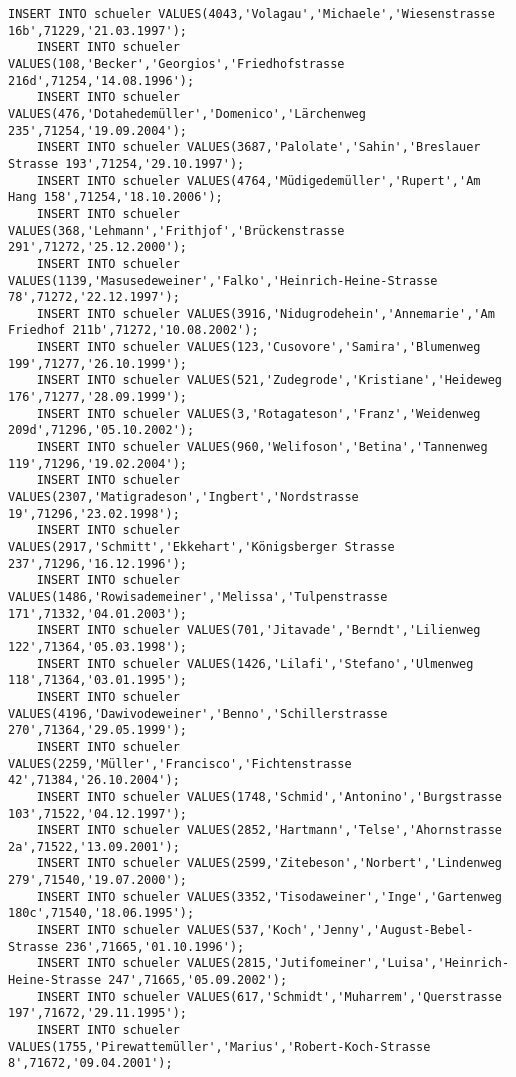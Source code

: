 \begin{lstlisting}[breaklines=True, numbers=none, basicstyle=\tiny, keepspaces=false]
	INSERT INTO schueler VALUES(4043,'Volagau','Michaele','Wiesenstrasse 16b',71229,'21.03.1997');
	INSERT INTO schueler VALUES(108,'Becker','Georgios','Friedhofstrasse 216d',71254,'14.08.1996');
	INSERT INTO schueler VALUES(476,'Dotahedemüller','Domenico','Lärchenweg 235',71254,'19.09.2004');
	INSERT INTO schueler VALUES(3687,'Palolate','Sahin','Breslauer Strasse 193',71254,'29.10.1997');
	INSERT INTO schueler VALUES(4764,'Müdigedemüller','Rupert','Am Hang 158',71254,'18.10.2006');
	INSERT INTO schueler VALUES(368,'Lehmann','Frithjof','Brückenstrasse 291',71272,'25.12.2000');
	INSERT INTO schueler VALUES(1139,'Masusedeweiner','Falko','Heinrich-Heine-Strasse 78',71272,'22.12.1997');
	INSERT INTO schueler VALUES(3916,'Nidugrodehein','Annemarie','Am Friedhof 211b',71272,'10.08.2002');
	INSERT INTO schueler VALUES(123,'Cusovore','Samira','Blumenweg 199',71277,'26.10.1999');
	INSERT INTO schueler VALUES(521,'Zudegrode','Kristiane','Heideweg 176',71277,'28.09.1999');
	INSERT INTO schueler VALUES(3,'Rotagateson','Franz','Weidenweg 209d',71296,'05.10.2002');
	INSERT INTO schueler VALUES(960,'Welifoson','Betina','Tannenweg 119',71296,'19.02.2004');
	INSERT INTO schueler VALUES(2307,'Matigradeson','Ingbert','Nordstrasse 19',71296,'23.02.1998');
	INSERT INTO schueler VALUES(2917,'Schmitt','Ekkehart','Königsberger Strasse 237',71296,'16.12.1996');
	INSERT INTO schueler VALUES(1486,'Rowisademeiner','Melissa','Tulpenstrasse 171',71332,'04.01.2003');
	INSERT INTO schueler VALUES(701,'Jitavade','Berndt','Lilienweg 122',71364,'05.03.1998');
	INSERT INTO schueler VALUES(1426,'Lilafi','Stefano','Ulmenweg 118',71364,'03.01.1995');
	INSERT INTO schueler VALUES(4196,'Dawivodeweiner','Benno','Schillerstrasse 270',71364,'29.05.1999');
	INSERT INTO schueler VALUES(2259,'Müller','Francisco','Fichtenstrasse 42',71384,'26.10.2004');
	INSERT INTO schueler VALUES(1748,'Schmid','Antonino','Burgstrasse 103',71522,'04.12.1997');
	INSERT INTO schueler VALUES(2852,'Hartmann','Telse','Ahornstrasse 2a',71522,'13.09.2001');
	INSERT INTO schueler VALUES(2599,'Zitebeson','Norbert','Lindenweg 279',71540,'19.07.2000');
	INSERT INTO schueler VALUES(3352,'Tisodaweiner','Inge','Gartenweg 180c',71540,'18.06.1995');
	INSERT INTO schueler VALUES(537,'Koch','Jenny','August-Bebel-Strasse 236',71665,'01.10.1996');
	INSERT INTO schueler VALUES(2815,'Jutifomeiner','Luisa','Heinrich-Heine-Strasse 247',71665,'05.09.2002');
	INSERT INTO schueler VALUES(617,'Schmidt','Muharrem','Querstrasse 197',71672,'29.11.1995');
	INSERT INTO schueler VALUES(1755,'Pirewattemüller','Marius','Robert-Koch-Strasse 8',71672,'09.04.2001');

\end{lstlisting}
